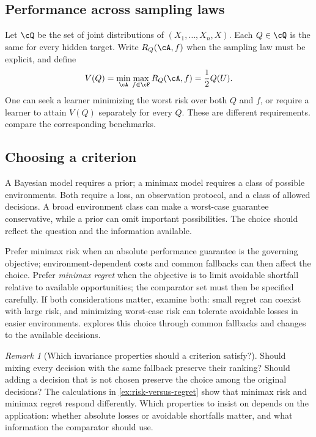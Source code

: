 \documentclass[11pt,twoside]{article}
\theoremstyle{definition}
\theoremstyle{remark}
\newtheorem{remark}[theorem]{Remark}
\begin{document}
\subsection{Performance across sampling laws}
\label{sec:sampling-law-comparison}
Let $\cQ$ be the set of joint distributions of $(X_1,\ldots,X_n,X)$.
Each $Q\in\cQ$ is the same for every hidden target. Write $R_Q(\cA,f)$
when the sampling law must be explicit, and define
\begin{equation}
V(Q)=\min_{\cA}\max_{f\in\cF}R_Q(\cA,f)=\frac12 Q(U).
\label{eq:q-specific-value}
\end{equation}
One can seek a learner minimizing the worst risk over both $Q$ and $f$, or
require a learner to attain $V(Q)$ separately for every $Q$. These are
different requirements. 
compare the corresponding benchmarks.

\subsection{Choosing a criterion}
A Bayesian model requires a prior; a minimax model requires a class of
possible environments. Both require a loss, an observation protocol, and a
class of allowed decisions. A broad environment class can make a worst-case
guarantee conservative, while a prior can omit important possibilities.
The choice should reflect the question and the information available.

Prefer minimax risk when an absolute performance guarantee is the governing
objective; environment-dependent costs and common fallbacks can then affect
the choice. Prefer \emph{minimax regret} when the objective is to limit avoidable
shortfall relative to available opportunities; the comparator set must then
be specified carefully. If both considerations matter, examine both: small
regret can coexist with large risk, and minimizing worst-case risk can
tolerate avoidable losses in easier environments.
 explores this choice through common fallbacks
and changes to the available decisions.

\begin{remark}[Which invariance properties should a criterion satisfy?]
\label{rem:criterion-invariance}
Should mixing every decision with the same fallback preserve their ranking?
Should adding a decision that is not chosen preserve the choice among the
original decisions? The calculations in \cref{ex:risk-versus-regret} show
that minimax risk and minimax regret respond differently. Which properties
to insist on depends on the application: whether absolute losses or avoidable
shortfalls matter, and what information the comparator should use.
\end{remark}
\end{document}
